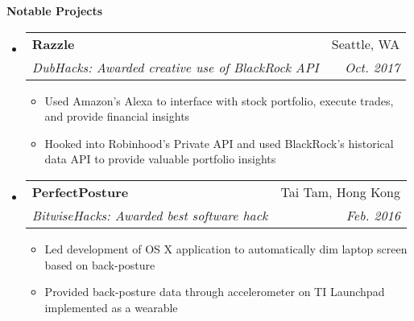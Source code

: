 \documentclass[letterpaper,10pt]{article}
\makeatletter
\newcommand{\resitem}[1]{\item #1 \vspace{-2pt}}
\newcommand{\resheading}[1]{{\large \colorbox{mygrey}{\begin{minipage}{\textwidth}{\textbf{#1 \vphantom{p\^{E}}}}\end{minipage}}}}
\newcommand{\ressubheading}[4]{
\begin{tabular*}{7.0in}{l@{\extracolsep{\fill}}r}
		\textbf{#1} & #2 \\
		\textit{#3} & \textit{#4} \\
\end{tabular*}\vspace{-6pt}}
\makeatother
\begin{document}
\resheading{Notable Projects}
\begin{itemize}
\item
	\ressubheading{Razzle}{Seattle, WA}{DubHacks: Awarded creative use of BlackRock API}{Oct. 2017}
	\begin{itemize}
		\resitem{Used Amazon's Alexa to interface with stock portfolio, execute trades, and provide financial insights}
		\resitem{Hooked into Robinhood's Private API and used BlackRock's historical data API to provide valuable portfolio insights}
	\end{itemize}
\item
	\ressubheading{PerfectPosture}{Tai Tam, Hong Kong}{BitwiseHacks: Awarded best software hack}{Feb. 2016}
	\begin{itemize}
		\resitem{Led development of OS X application to automatically dim laptop screen based on back-posture}
		\resitem{Provided back-posture data through accelerometer on TI Launchpad implemented as a wearable}
	\end{itemize}

\end{itemize}
\end{document}
